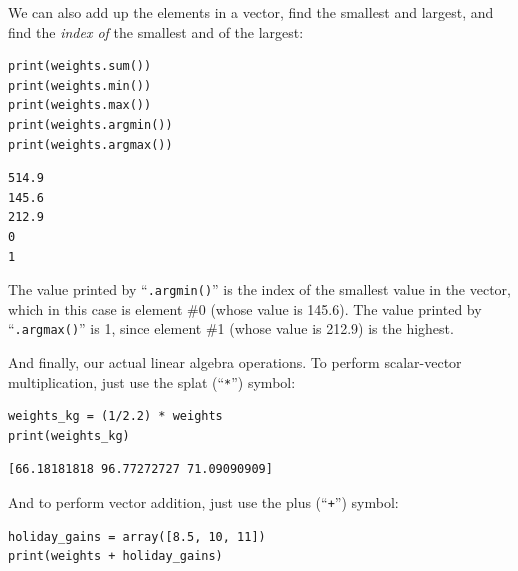 \medskip
We can also add up the elements in a vector, find the smallest and largest, and
find the \textit{index of} the smallest and of the largest:


\begin{Verbatim}[fontsize=\small,samepage=true,frame=single,framesep=3mm]
print(weights.sum())
print(weights.min())
print(weights.max())
print(weights.argmin())
print(weights.argmax())
\end{Verbatim}
\vspace{-.2in}

\begin{Verbatim}[fontsize=\small,samepage=true,frame=leftline,framesep=5mm,framerule=1mm]
514.9
145.6
212.9
0
1
\end{Verbatim}

The value printed by ``\texttt{.argmin()}'' is the index of the smallest value
in the vector, which in this case is element \#0 (whose value is 145.6). 
The value printed by ``\texttt{.argmax()}'' is 1, since element \#1 (whose
value is 212.9) is the highest.

\bigskip

\pagebreak
{}
And finally, our actual linear algebra operations. To perform scalar-vector
multiplication, just use the splat (``\texttt{*}'') symbol:

\begin{Verbatim}[fontsize=\small,samepage=true,frame=single,framesep=3mm]
weights_kg = (1/2.2) * weights
print(weights_kg)
\end{Verbatim}
\vspace{-.2in}

\begin{Verbatim}[fontsize=\small,samepage=true,frame=leftline,framesep=5mm,framerule=1mm]
[66.18181818 96.77272727 71.09090909]
\end{Verbatim}

And to perform vector addition, just use the plus (``\texttt{+}'') symbol:

\begin{Verbatim}[fontsize=\small,samepage=true,frame=single,framesep=3mm]
holiday_gains = array([8.5, 10, 11])
print(weights + holiday_gains)
\end{Verbatim}
\vspace{-.2in}

